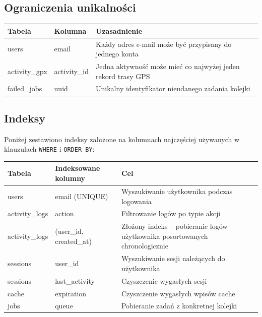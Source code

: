 \documentclass[12pt,a4paper]{report}
\begin{document}
\subsection{Ograniczenia unikalności}

\begin{center}
\begin{tabularx}{\textwidth}{|l|l|X|}
\hline
\textbf{Tabela}    & \textbf{Kolumna}      & \textbf{Uzasadnienie}                        \\
\hline
users              & email                 & Każdy adres e-mail może być przypisany do jednego konta \\
\hline
activity\_gpx      & activity\_id          & Jedna aktywność może mieć co najwyżej jeden rekord trasy GPS \\
\hline
failed\_jobs       & uuid                  & Unikalny identyfikator nieudanego zadania kolejki \\
\hline
\end{tabularx}
\end{center}

\subsection{Indeksy}

Poniżej zestawiono indeksy założone na kolumnach najczęściej używanych w klauzulach \texttt{WHERE} i \texttt{ORDER BY}:

\begin{center}
\begin{tabularx}{\textwidth}{|l|l|X|}
\hline
\textbf{Tabela}    & \textbf{Indeksowane kolumny}        & \textbf{Cel}                              \\
\hline
users              & email (UNIQUE)                      & Wyszukiwanie użytkownika podczas logowania \\
\hline
activity\_logs     & action                              & Filtrowanie logów po typie akcji          \\
\hline
activity\_logs     & (user\_id, created\_at)             & Złożony indeks -- pobieranie logów użytkownika posortowanych chronologicznie \\
\hline
sessions           & user\_id                            & Wyszukiwanie sesji należących do użytkownika \\
\hline
sessions           & last\_activity                      & Czyszczenie wygasłych sesji               \\
\hline
cache              & expiration                          & Czyszczenie wygasłych wpisów cache        \\
\hline
jobs               & queue                               & Pobieranie zadań z konkretnej kolejki     \\
\hline
\end{tabularx}
\end{center}
\end{document}
